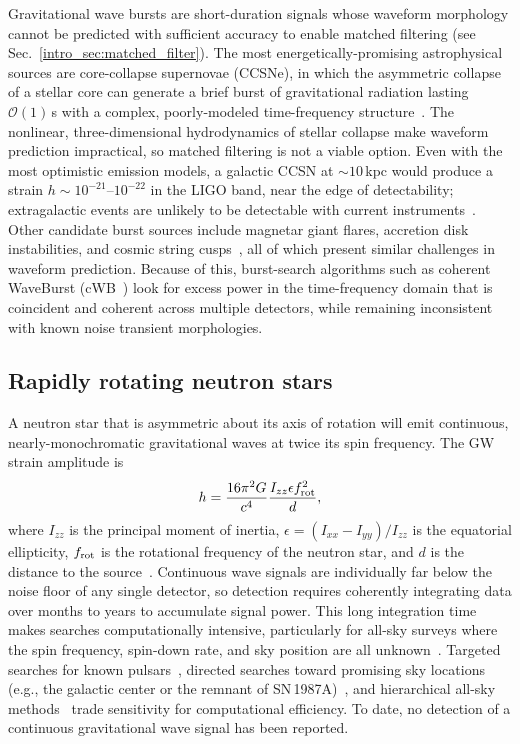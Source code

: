 \begin{refsection}
Gravitational wave bursts are short-duration signals whose waveform morphology cannot be predicted with sufficient accuracy to enable matched filtering (see Sec.~\ref{intro_sec:matched_filter}).
The most energetically-promising astrophysical sources are core-collapse supernovae (CCSNe), in which the asymmetric collapse of a stellar core can generate a brief burst of gravitational radiation lasting $\mathcal{O}(1)$\,s with a complex, poorly-modeled time-frequency structure~\cite{Ott_2009}.
The nonlinear, three-dimensional hydrodynamics of stellar collapse make waveform prediction impractical, so matched filtering is not a viable option.
Even with the most optimistic emission models, a galactic CCSN at $\sim 10$\,kpc would produce a strain $h \sim 10^{-21}$--$10^{-22}$ in the LIGO band, near the edge of detectability; extragalactic events are unlikely to be detectable with current instruments~\cite{Ott_2009}.
Other candidate burst sources include magnetar giant flares, accretion disk instabilities, and cosmic string cusps~\cite{Abbott_2017_burst}, all of which present similar challenges in waveform prediction.
Because of this, burst-search algorithms such as coherent WaveBurst (cWB~\cite{PhysRevD.93.042004}) look for excess power in the time-frequency domain that is coincident and coherent across multiple detectors, while remaining inconsistent with known noise transient morphologies.

\subsection{Rapidly rotating neutron stars}

A neutron star that is asymmetric about its axis of rotation will emit continuous, nearly-monochromatic gravitational waves at twice its spin frequency.
The GW strain amplitude is
\begin{equation}
    h = \frac{16\pi^2 G}{c^4} \frac{I_{zz} \epsilon f_{\rm rot}^2}{d},
\end{equation}
where $I_{zz}$ is the principal moment of inertia, $\epsilon = (I_{xx} - I_{yy})/I_{zz}$ is the equatorial ellipticity, $f_{\rm rot}$ is the rotational frequency of the neutron star, and $d$ is the distance to the source~\cite{2009ASSL..357.....B}.
Continuous wave signals are individually far below the noise floor of any single detector, so detection requires coherently integrating data over months to years to accumulate signal power.
This long integration time makes searches computationally intensive, particularly for all-sky surveys where the spin frequency, spin-down rate, and sky position are all unknown~\cite{Brady_1998}.
Targeted searches for known pulsars~\cite{Abbott_2017_continuous}, directed searches toward promising sky locations (e.g., the galactic center or the remnant of SN\,1987A)~\cite{PhysRevLett.118.121102}, and hierarchical all-sky methods~\cite{EinsteinAtHome_2009} trade sensitivity for computational efficiency.
To date, no detection of a continuous gravitational wave signal has been reported.


\end{refsection}
